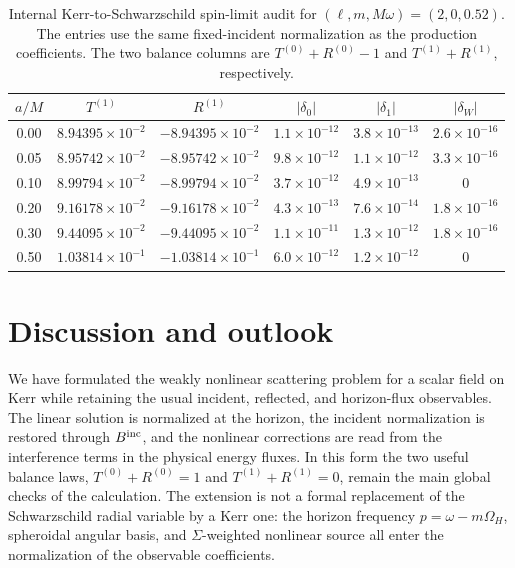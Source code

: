\documentclass[aps,prd,twocolumn,10pt,nofootinbib,superscriptaddress,floatfix]{revtex4-2}
\newcommand{\Bin}{B^{\rm inc}}
\begin{document}
\begin{table}[t]
\caption{Internal Kerr-to-Schwarzschild spin-limit audit for
$(\ell,m,M\omega)=(2,0,0.52)$.  The entries use the same fixed-incident
normalization as the production coefficients.  The two balance columns are
$T^{(0)}+R^{(0)}-1$ and $T^{(1)}+R^{(1)}$, respectively.}
\label{tab:spin-limit}
\begin{ruledtabular}
\begin{tabular}{c c c c c c}
$a/M$ & $T^{(1)}$ & $R^{(1)}$ & $|\delta_0|$ & $|\delta_1|$ & $|\delta_W|$\\
\hline
0.00 & $8.94395\times10^{-2}$ & $-8.94395\times10^{-2}$ & $1.1\times10^{-12}$ & $3.8\times10^{-13}$ & $2.6\times10^{-16}$\\
0.05 & $8.95742\times10^{-2}$ & $-8.95742\times10^{-2}$ & $9.8\times10^{-12}$ & $1.1\times10^{-12}$ & $3.3\times10^{-16}$\\
0.10 & $8.99794\times10^{-2}$ & $-8.99794\times10^{-2}$ & $3.7\times10^{-12}$ & $4.9\times10^{-13}$ & $0$\\
0.20 & $9.16178\times10^{-2}$ & $-9.16178\times10^{-2}$ & $4.3\times10^{-13}$ & $7.6\times10^{-14}$ & $1.8\times10^{-16}$\\
0.30 & $9.44095\times10^{-2}$ & $-9.44095\times10^{-2}$ & $1.1\times10^{-11}$ & $1.3\times10^{-12}$ & $1.8\times10^{-16}$\\
0.50 & $1.03814\times10^{-1}$ & $-1.03814\times10^{-1}$ & $6.0\times10^{-12}$ & $1.2\times10^{-12}$ & $0$\\
\end{tabular}
\end{ruledtabular}
\end{table}

\section{Discussion and outlook}

We have formulated the weakly nonlinear scattering problem for a scalar field
on Kerr while retaining the usual incident, reflected, and horizon-flux
observables.  The linear solution is normalized at
the horizon, the incident normalization is restored through $\Bin$, and the
nonlinear corrections are read from the interference terms in the physical
energy fluxes.  In this form the two useful balance laws,
$T^{(0)}+R^{(0)}=1$ and $T^{(1)}+R^{(1)}=0$, remain the main global checks of
the calculation.  The extension is not a formal replacement of the
Schwarzschild radial variable by a Kerr one: the horizon frequency
$p=\omega-m\Omega_H$, spheroidal angular basis, and $\Sigma$-weighted nonlinear
source all enter the normalization of the observable coefficients.
\end{document}
